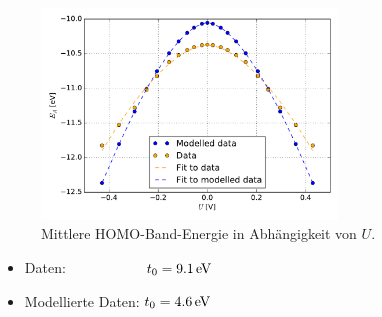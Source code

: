 \begin{frame}
\begin{figure}
	\centering
	\includegraphics[width = 0.7\textwidth]{Images/Hydrogen/charging/Homo_energy_charge}
	\caption{Mittlere HOMO-Band-Energie in Abhängigkeit von $U$.}
\end{figure}
\begin{itemize}
	\item Daten: $\hspace*{1.9cm} t_0 = \unit[9.1]{eV}$
	\item Modellierte Daten: $t_0 = \unit[4.6]{eV}$
\end{itemize}
\end{frame}